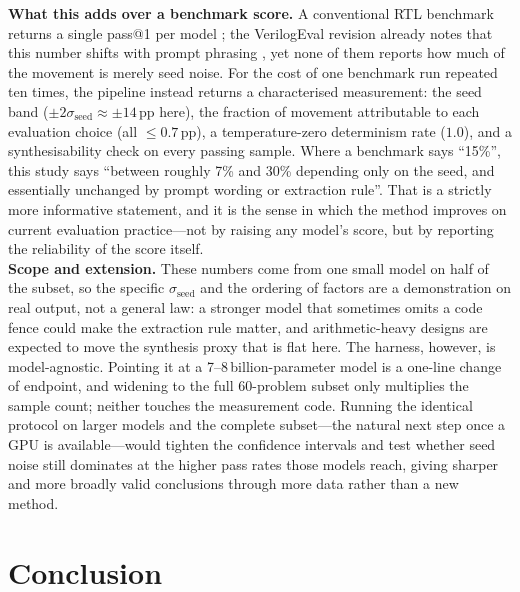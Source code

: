 \documentclass[conference]{IEEEtran}
\begin{document}
\noindent \textbf{What this adds over a benchmark score.} A conventional RTL benchmark returns a single pass@1 per model \cite{P12_Liu2023,P16_Lu2024}; the VerilogEval revision already notes that this number shifts with prompt phrasing \cite{P15_Pinckney2025}, yet none of them reports how much of the movement is merely seed noise. For the cost of one benchmark run repeated ten times, the pipeline instead returns a characterised measurement: the seed band ($\pm 2\sigma_{\text{seed}}\approx\pm 14$\,pp here), the fraction of movement attributable to each evaluation choice (all $\leq 0.7$\,pp), a temperature-zero determinism rate ($1.0$), and a synthesisability check on every passing sample. Where a benchmark says ``15\%'', this study says ``between roughly 7\% and 30\% depending only on the seed, and essentially unchanged by prompt wording or extraction rule''. That is a strictly more informative statement, and it is the sense in which the method improves on current evaluation practice---not by raising any model's score, but by reporting the reliability of the score itself.\\

\noindent \textbf{Scope and extension.} These numbers come from one small model on half of the subset, so the specific $\sigma_{\text{seed}}$ and the ordering of factors are a demonstration on real output, not a general law: a stronger model that sometimes omits a code fence could make the extraction rule matter, and arithmetic-heavy designs are expected to move the synthesis proxy that is flat here. The harness, however, is model-agnostic. Pointing it at a 7--8\,billion-parameter model is a one-line change of endpoint, and widening to the full 60-problem subset only multiplies the sample count; neither touches the measurement code. Running the identical protocol on larger models and the complete subset---the natural next step once a GPU is available---would tighten the confidence intervals and test whether seed noise still dominates at the higher pass rates those models reach, giving sharper and more broadly valid conclusions through more data rather than a new method.

\section{Conclusion}\label{sec_conclusion}
\end{document}
